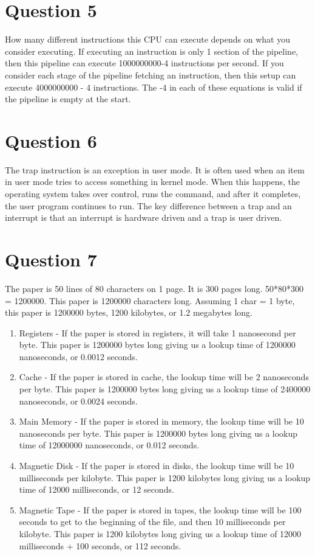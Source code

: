 \documentclass[12pt]{extarticle}
\begin{document}
		\section*{Question 5}
			How many different instructions this CPU can execute depends on what you consider executing.  If executing an instruction is only 1 section of the pipeline, then this pipeline can execute 1000000000-4 instructions per second.  If you consider each stage of the pipeline fetching an instruction, then this setup can execute 4000000000 - 4 instructions.  The -4 in each of these equations is valid if the pipeline is empty at the start.

		\section*{Question 6}
			The trap instruction is an exception in user mode.  It is often used when an item in user mode tries to access something in kernel mode.  When this happens, the operating system takes over control, runs the command, and after it completes, the user program continues to run.  The key difference between a trap and an interrupt is that an interrupt is hardware driven and a trap is user driven.

		\section*{Question 7}
			The paper is 50 lines of 80 characters on 1 page.  It is 300 pages long.  50*80*300 = 1200000.  This paper is 1200000 characters long.  Assuming 1 char = 1 byte, this paper is 1200000 bytes, 1200 kilobytes, or 1.2 megabytes long.
			\begin{enumerate}
				\item Registers - If the paper is stored in registers, it will take 1 nanosecond per byte.  This paper is 1200000 bytes long giving us a lookup time of 1200000 nanoseconds, or 0.0012 seconds.
				\item Cache - If the paper is stored in cache, the lookup time will be 2 nanoseconds per byte.  This paper is 1200000 bytes long giving us a lookup time of 2400000 nanoseconds, or 0.0024 seconds.
				\item Main Memory - If the paper is stored in memory, the lookup time will be 10 nanoseconds per byte.  This paper is 1200000 bytes long giving us a lookup time of 12000000 nanoseconds, or 0.012 seconds.
				\item Magnetic Disk - If the paper is stored in disks, the lookup time will be 10 milliseconds per kilobyte.  This paper is 1200 kilobytes long giving us a lookup time of 12000 milliseconds, or 12 seconds.
				\item Magnetic Tape - If the paper is stored in tapes, the lookup time will be 100 seconds to get to the beginning of the file, and then 10 milliseconds per kilobyte.  This paper is 1200 kilobytes long giving us a lookup time of 12000 milliseconds + 100 seconds, or 112 seconds.
			\end{enumerate}
\end{document}
